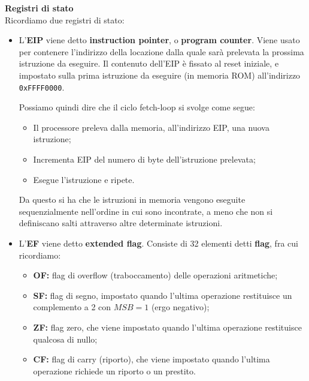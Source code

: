 \documentclass[a4paper,11pt]{article}
\begin{document}
\par\medskip
\noindent
\textbf{\textsf{Registri di stato}} \\
Ricordiamo due registri di stato:
\begin{itemize}
	\item  L'\textbf{EIP} viene detto \textbf{instruction pointer}, o \textbf{program counter}.
Viene usato per contenere l'indirizzo della locazione dalla quale sarà prelevata la prossima istruzione da eseguire.
Il contenuto dell'EIP è fissato al reset iniziale, e impostato sulla prima istruzione da eseguire (in memoria ROM) all'indirizzo \texttt{0xFFFF0000}.

Possiamo quindi dire che il ciclo fetch-loop si svolge come segue:
\begin{itemize}
	\item Il processore preleva dalla memoria, all'indirizzo EIP, una nuova istruzione;
	\item Incrementa EIP del numero di byte dell'istruzione prelevata;
	\item Esegue l'istruzione e ripete.
\end{itemize}

Da questo si ha che le istruzioni in memoria vengono eseguite sequenzialmente nell'ordine in cui sono incontrate, a meno che non si definiscano salti attraverso altre determinate istruzioni.
	
\item L'\textbf{EF} viene detto \textbf{extended flag}.
Consiste di 32 elementi detti \textbf{flag}, fra cui ricordiamo:
\begin{itemize}
	\item \textbf{OF:} flag di overflow (traboccamento) delle operazioni aritmetiche;
	\item \textbf{SF:} flag di segno, impostato quando l'ultima operazione restituisce un complemento a 2 con $MSB = 1$ (ergo negativo);
	\item \textbf{ZF:} flag zero, che viene impostato quando l'ultima operazione restituisce qualcosa di nullo;
	\item \textbf{CF:} flag di carry (riporto), che viene impostato quando l'ultima operazione richiede un riporto o un prestito.
\end{itemize}

\end{itemize}
\end{document}
